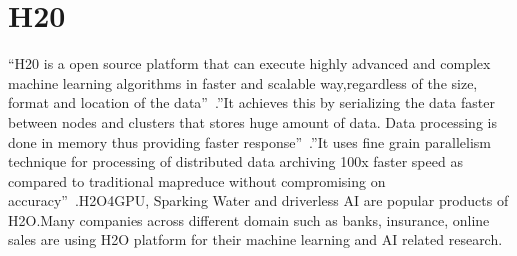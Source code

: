\section{H20}


``H20 is a open source platform that can execute highly advanced 
and complex machine learning algorithms in faster and scalable 
way,regardless of the size, format and location of the 
data''~\cite{hid-sp18-523-www-h2o}.''It achieves this by serializing 
the data faster between nodes and clusters that stores huge amount 
of data. Data processing is done in memory thus providing faster 
response''~\cite{hid-sp18-523-www-h2o}.''It uses fine grain parallelism 
technique for processing of distributed data archiving 100x faster 
speed as compared to traditional mapreduce without compromising 
on accuracy''~\cite{hid-sp18-523-www-h2o}.H2O4GPU, Sparking Water
and driverless AI are popular products of H2O.Many companies
across different domain such as banks, insurance, online sales 
are using H2O platform for their machine learning and AI related
research.





